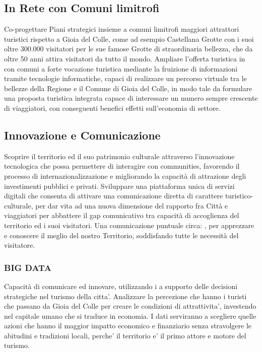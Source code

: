 \documentclass[a4paper,14pt,italian]{sphinxmanual}
\begin{document}
\subsection{In Rete con Comuni limitrofi}
\label{\detokenize{turismo:in-rete-con-comuni-limitrofi}}
Co-progettare Piani strategici insieme a comuni limitrofi maggiori attrattori turistici rispetto a Gioia del Colle, come ad esempio Castellana Grotte con i suoi oltre 300.000 visitatori per le sue famose Grotte di straordinaria bellezza, che da oltre 50 anni attira visitatori da tutto il mondo.
Ampliare l’offerta turistica in  con comuni a forte vocazione turistica mediante la fruizione di informazioni tramite tecnologie informatiche, capaci di realizzare un percorso virtuale tra le bellezze della Regione e il Comune di Gioia del Colle, in modo tale da formulare una proposta turistica integrata capace di interessare un numero sempre crescente di viaggiatori, con conseguenti benefici effetti sull’economia di settore.


\subsection{Innovazione e Comunicazione}
\label{\detokenize{turismo:innovazione-e-comunicazione}}
Scoprire il territorio ed il suo patrimonio culturale attraverso l’innovazione tecnologica che possa permettere di interagire con communities, favorendo il processo di internazionalizzazione e migliorando la capacità di attrazione degli investimenti pubblici e privati.
Sviluppare una piattaforma unica di servizi digitali che consenta di attivare una comunicazione diretta di carattere turistico-culturale, per dar vita ad una nuova dimensione del rapporto fra Città e viaggiatori per abbattere il gap comunicativo tra capacità di accoglienza del territorio ed i suoi visitatori.
Una comunicazione puntuale circa: , per apprezzare e conoscere il meglio del nostro Territorio, soddisfando tutte le necessità del visitatore.


\subsubsection{BIG DATA}
\label{\detokenize{turismo:big-data}}
Capacità di comunicare ed innovare, utilizzando i  a supporto delle decisioni strategiche nel turismo della citta’.
Analizzare la percezione che hanno i turisti che passano da Gioia del Colle per creare le condizioni di attrattivita’, investendo nel capitale umano che si traduce in economia.
I dati serviranno a scegliere quelle azioni che hanno il maggior impatto economico e finanziario senza stravolgere le abitudini e tradizioni locali, perche’ il territorio e’ il primo attore e motore del turismo.



\renewcommand{\indexname}{Indice}
\printindex
\end{document}
